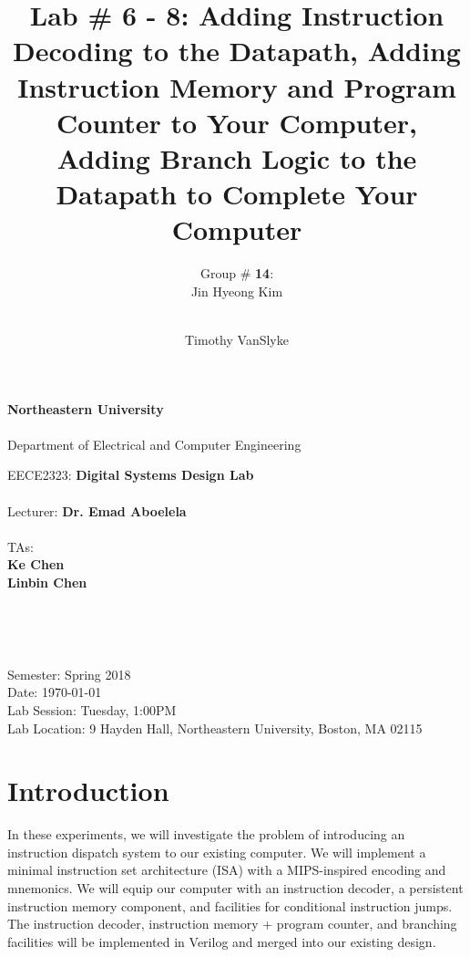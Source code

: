 \documentclass[12pt, letterpaper]{article}
\title{Lab \# 6 - 8: \textbf{Adding Instruction Decoding to the Datapath}, \textbf{Adding Instruction Memory and Program Counter to Your Computer}, \textbf{Adding Branch Logic to the Datapath to Complete Your Computer}}
\author{Group \# \textbf{14}:\\ Jin Hyeong Kim \and\\ Timothy VanSlyke}
\begin{document}
\begin{titlepage}
	\begin{center}
		{\Large
			\textbf{Northeastern University}\\
			~\\
			Department of Electrical and Computer Engineering\\ 
		}

		\vfill

		{\large
			EECE2323: \textbf{Digital Systems Design Lab}\\
			~\\
			Lecturer: \textbf{Dr. Emad Aboelela}\\
			~\\
			TAs:\\
			\textbf{Ke Chen}\\
			\textbf{Linbin Chen}\\
		}
	
		\vfill

		{\Large \thetitle}\\
	
		\vfill

		{\large \theauthor}\\

		\vfill

		{\large
			Semester: Spring 2018\\
			Date: \today\\
			Lab Session: Tuesday, 1:00PM\\ 
			Lab Location: 9 Hayden Hall, Northeastern University, Boston, MA 02115\\
		}

	\end{center}
\end{titlepage}

\tableofcontents


\newpage
\section{Introduction}
In these experiments, we will investigate the problem of introducing an instruction dispatch system to our existing computer.  We will implement a minimal instruction set architecture (ISA) with a MIPS-inspired encoding and mnemonics.  We will equip our computer with an instruction decoder, a persistent instruction memory component, and facilities for conditional instruction jumps.  The instruction decoder, instruction memory + program counter, and branching facilities will be implemented in Verilog and merged into our existing design.
\end{document}

